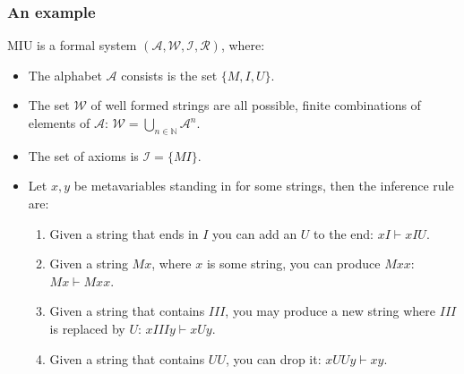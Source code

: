   \begin{frame}
    \frametitle{An example}
    \begin{definition}
      MIU is a formal system $(\mathcal{A}, \mathcal{W}, \mathcal{I}, \mathcal{R})$, where:
      \begin{itemize}
          \pause \item The alphabet $\mathcal{A}$ consists is the set $\{M,I,U\}$.
          \pause \item The set $\mathcal{W}$ of well formed strings are all possible, finite combinations of elements of $\mathcal{A}$: $\mathcal{W} = \bigcup_{n \in \mathbb{N}}\mathcal{A}^n$.
          \pause \item The set of axioms is $\mathcal{I} = \{MI\}$.
          \pause \item Let $x, y$ be metavariables standing in for some strings, then the inference rule are:
          \begin{enumerate}
            \item Given a string that ends in $I$ you can add an $U$ to the end: $xI \vdash xIU$.
            \item Given a string $Mx$, where $x$ is some string, you can produce $Mxx$: $Mx \vdash Mxx$.
            \item Given a string that contains $III$, you may produce a new string where $III$ is replaced by $U$: $xIIIy \vdash xUy$.
            \item Given a string that contains $UU$, you can drop it: $xUUy \vdash xy$.
          \end{enumerate}
      \end{itemize}
    \end{definition}
  \end{frame}
  
